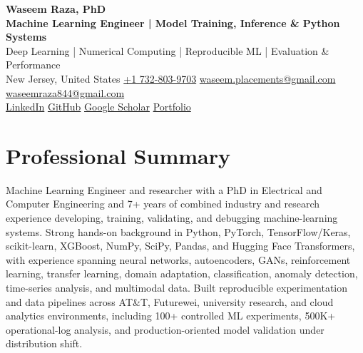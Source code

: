 \documentclass[10pt,letterpaper]{extarticle}
\begin{document}
\begin{center}
{\LARGE\bfseries Waseem Raza, PhD}\\[2pt]
{\large\bfseries Machine Learning Engineer | Model Training, Inference \& Python Systems}\\[1pt]
{\small Deep Learning | Numerical Computing | Reproducible ML | Evaluation \& Performance}\\[3pt]
{\footnotesize New Jersey, United States \quad
{}\enspace \href{tel:+17328039703}{+1 732-803-9703} \quad
{}\enspace \href{mailto:waseem.placements@gmail.com}{waseem.placements@gmail.com} \textbar{}
\href{mailto:waseemraza844@gmail.com}{waseemraza844@gmail.com}\\[1pt]
\href{https://www.linkedin.com/in/waseem-raza-phd-9a737858/}{LinkedIn} \textbar{}
\href{https://github.com/WaseemRaza844}{GitHub} \textbar{}
\href{https://scholar.google.com/citations?user=d58Drr0AAAAJ&hl=en}{Google Scholar} \textbar{}
\href{https://waseemraza844.github.io/portfolio/}{Portfolio}}
\end{center}
\vspace{-5pt}

\section{Professional Summary}
Machine Learning Engineer and researcher with a PhD in Electrical and Computer Engineering and 7+ years of combined industry and research experience developing, training, validating, and debugging machine-learning systems. Strong hands-on background in Python, PyTorch, TensorFlow/Keras, scikit-learn, XGBoost, NumPy, SciPy, Pandas, and Hugging Face Transformers, with experience spanning neural networks, autoencoders, GANs, reinforcement learning, transfer learning, domain adaptation, classification, anomaly detection, time-series analysis, and multimodal data. Built reproducible experimentation and data pipelines across AT\&T, Futurewei, university research, and cloud analytics environments, including 100+ controlled ML experiments, 500K+ operational-log analysis, and production-oriented model validation under distribution shift.
\end{document}
